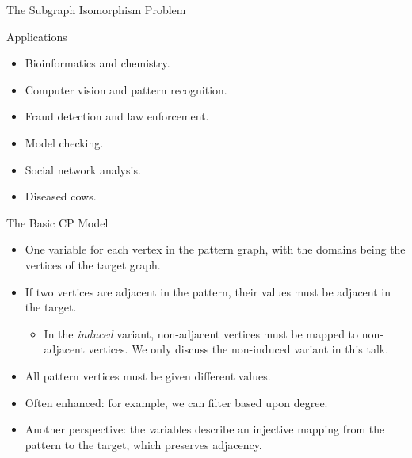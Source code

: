 \documentclass{beamer}
\begin{document}
\begin{frame}{The Subgraph Isomorphism Problem}

\end{frame}

\begin{frame}{Applications}
    \begin{itemize}
        \item Bioinformatics and chemistry.
        \item Computer vision and pattern recognition.
        \item Fraud detection and law enforcement.
        \item Model checking.
        \item Social network analysis.
        \item Diseased cows.
    \end{itemize}
\end{frame}

\begin{frame}{The Basic CP Model}
    \begin{itemize}
        \item One variable for each vertex in the pattern graph, with the domains being the vertices
            of the target graph.
        \item If two vertices are adjacent in the pattern, their values must be adjacent
            in the target.
            \begin{itemize}
                \item In the \emph{induced} variant, non-adjacent vertices must be mapped to
                    non-adjacent vertices. We only discuss the non-induced variant in this talk.
            \end{itemize}
        \item All pattern vertices must be given different values.
        \item Often enhanced: for example, we can filter based upon degree.
        \item Another perspective: the variables describe an injective mapping from the pattern to
            the target, which preserves adjacency.
    \end{itemize}
\end{frame}
\end{document}
